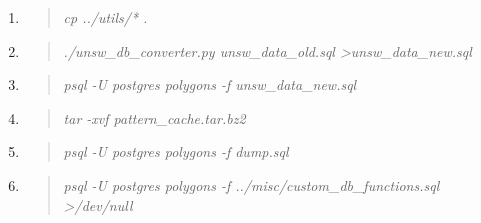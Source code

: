 \documentclass[12pt]{article}
\newenvironment{command}
   { 
      \begin{quote}\itshape
      \color{blue}
   }
   { \end{quote} }
\begin{document}
\begin{enumerate}
   \item \begin{command} cp ../utils/* . \end{command}
   \item \begin{command} ./unsw\_db\_converter.py unsw\_data\_old.sql
                         \textgreater unsw\_data\_new.sql\end{command}
   \item \begin{command} psql -U postgres polygons -f unsw\_data\_new.sql \end{command}
   \item \begin{command} tar -xvf pattern\_cache.tar.bz2 \end{command}
   \item \begin{command} psql -U postgres polygons -f dump.sql \end{command}
   \item \begin{command} psql -U postgres polygons -f ../misc/custom\_db\_functions.sql >/dev/null \end{command}
\end{enumerate}
\end{document}
